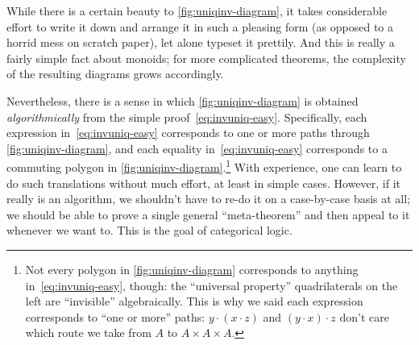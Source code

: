 While there is a certain beauty to \cref{fig:uniqinv-diagram}, it takes considerable effort to write it down and arrange it in such a pleasing form (as opposed to a horrid mess on scratch paper), let alone typeset it prettily.
And this is really a fairly simple fact about monoids; for more complicated theorems, the complexity of the resulting diagrams grows accordingly.

Nevertheless, there is a sense in which \cref{fig:uniqinv-diagram} is obtained \emph{algorithmically} from the simple proof~\eqref{eq:invuniq-easy}.
Specifically, each expression in~\eqref{eq:invuniq-easy} corresponds to one or more paths through \cref{fig:uniqinv-diagram}, and each equality in~\eqref{eq:invuniq-easy} corresponds to a commuting polygon in \cref{fig:uniqinv-diagram}.\footnote{Not every polygon in \cref{fig:uniqinv-diagram} corresponds to anything in~\eqref{eq:invuniq-easy}, though: the ``universal property'' quadrilaterals on the left are ``invisible'' algebraically.
  This is why we said each expression corresponds to ``one or more'' paths: $y\cdot (x\cdot z)$ and $(y\cdot x)\cdot z$ don't care which route we take from $A$ to $A\times A\times A$.}
With experience, one can learn to do such translations without much effort, at least in simple cases.
However, if it really is an algorithm, we shouldn't have to re-do it on a case-by-case basis at all; we should be able to prove a single general ``meta-theorem'' and then appeal to it whenever we want to.
This is the goal of categorical logic.

